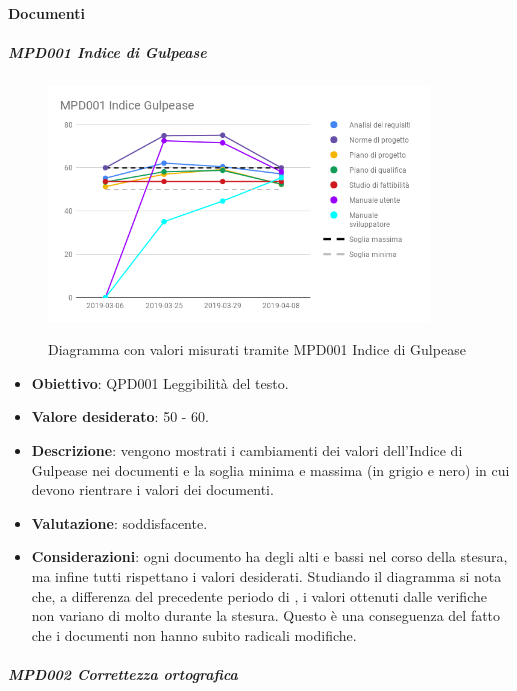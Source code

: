 	\paragraph{Documenti}

		\subparagraph{MPD001 Indice di Gulpease}

		\begin{figure}[H]
			\centering
			\includegraphics[width=0.9\textwidth]{img/cruscotti/RQ/MPD001.png}
			\label{immaginegulpeaseRQ}
			\caption{Diagramma con valori misurati tramite MPD001 Indice di Gulpease}
		\end{figure}

		\begin{itemize}
			\item \textbf{Obiettivo}: QPD001 Leggibilità del testo.
			\item \textbf{Valore desiderato}: 50 - 60.
			\item \textbf{Descrizione}: vengono mostrati i cambiamenti dei valori dell'Indice di Gulpease nei documenti e la soglia minima e massima (in grigio e nero) in cui devono rientrare i valori dei documenti.
			\item \textbf{Valutazione}: soddisfacente.
			\item \textbf{Considerazioni}: ogni documento ha degli alti e bassi nel corso della stesura, ma infine tutti rispettano i valori desiderati. Studiando il diagramma si nota che, a differenza del
			precedente periodo di \RP, i valori ottenuti dalle verifiche non variano di molto durante la
			stesura. Questo è una conseguenza del fatto che i documenti non hanno subito radicali modifiche.

		\end{itemize}

		\subparagraph{MPD002 Correttezza ortografica}

